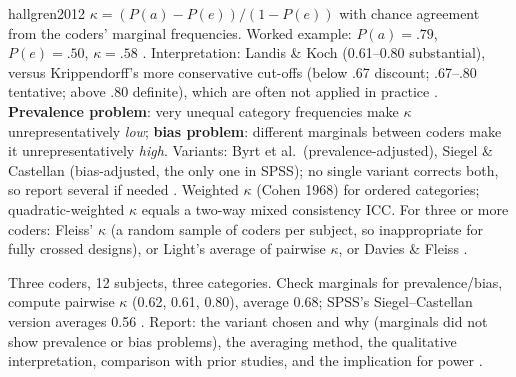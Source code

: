 \begin{papercard}{hallgren2012}
 $\kappa=(P(a)-P(e))/(1-P(e))$ with chance agreement from the coders' marginal frequencies. Worked example: $P(a)=.79$, $P(e)=.50$, $\kappa=.58$ . Interpretation: Landis \& Koch (0.61--0.80 substantial), versus Krippendorff's more conservative cut-offs (below .67 discount; .67--.80 tentative; above .80 definite), which are often not applied in practice . \textbf{Prevalence problem}: very unequal category frequencies make $\kappa$ unrepresentatively \emph{low}; \textbf{bias problem}: different marginals between coders make it unrepresentatively \emph{high}. Variants: Byrt et al.\ (prevalence-adjusted), Siegel \& Castellan (bias-adjusted, the only one in SPSS); no single variant corrects both, so report several if needed . Weighted $\kappa$ (Cohen 1968) for ordered categories; quadratic-weighted $\kappa$ equals a two-way mixed consistency ICC. For three or more coders: Fleiss' $\kappa$ (a random sample of coders per subject, so inappropriate for fully crossed designs), or Light's average of pairwise $\kappa$, or Davies \& Fleiss .

 Three coders, 12 subjects, three categories. Check marginals for prevalence/bias, compute pairwise $\kappa$ (0.62, 0.61, 0.80), average 0.68; SPSS's Siegel--Castellan version averages 0.56 . Report: the variant chosen and why (marginals did not show prevalence or bias problems), the averaging method, the qualitative interpretation, comparison with prior studies, and the implication for power .


\end{papercard}
